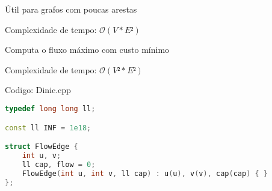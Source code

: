 \documentclass[10pt, a4paper, oneside]{book}
\begin{document}
\textbf{} 


Útil para grafos com poucas arestas



Complexidade de tempo: $\mathcal{O}(V * E²)$



\textbf{} 


Computa o fluxo máximo com custo mínimo



Complexidade de tempo: $\mathcal{O}(V² * E²)$

\hfill

Codigo: Dinic.cpp

\begin{lstlisting}[language=C++]
typedef long long ll;

const ll INF = 1e18;

struct FlowEdge {
    int u, v;
    ll cap, flow = 0;
    FlowEdge(int u, int v, ll cap) : u(u), v(v), cap(cap) { }
};


\end{lstlisting}
\end{document}
